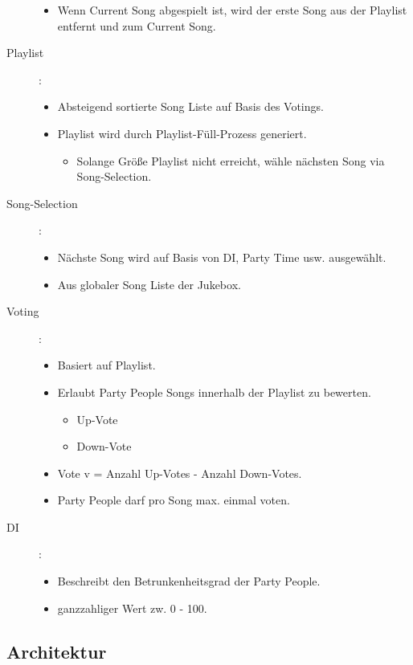 \begin{description}
\begin{itemize}
			\item Wenn Current Song abgespielt ist, wird der erste Song aus der Playlist entfernt und zum Current Song.
		\end{itemize}
	\item [Playlist]:
		\begin{itemize}
			\item Absteigend sortierte Song Liste auf Basis des Votings.
			\item Playlist wird durch Playlist-Füll-Prozess generiert.
				\begin{itemize}
					\item Solange Größe Playlist nicht erreicht, wähle nächsten Song via Song-Selection.
				\end{itemize}
		\end{itemize}
	\item [Song-Selection]:
		\begin{itemize}
			\item Nächste Song wird auf Basis von DI, Party Time usw. ausgewählt.
			\item Aus globaler Song Liste der Jukebox.
		\end{itemize}
	\item [Voting]:
		\begin{itemize}
			\item Basiert auf Playlist.
			\item Erlaubt Party People Songs innerhalb der Playlist zu bewerten.
				\begin{itemize}
					\item Up-Vote
					\item Down-Vote
				\end{itemize}
			\item Vote v = Anzahl Up-Votes - Anzahl Down-Votes.
			\item Party People darf pro Song max. einmal voten.
		\end{itemize}
	\item [DI] :
		\begin{itemize}
			\item Beschreibt den Betrunkenheitsgrad der Party People.
			\item ganzzahliger Wert zw. 0 - 100.
		\end{itemize}
\end{description}



\subsection{Architektur}

